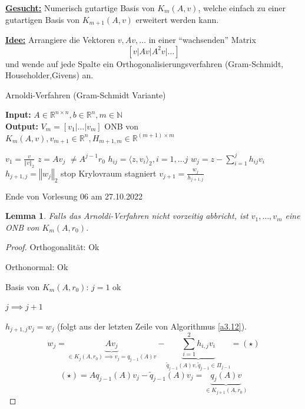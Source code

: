 \documentclass{book}
\newtheorem{lemma}[algorithm]{Lemma}
\def\R{\mathbb{R}}
\def\N{\mathbb{N}}
\begin{document}
            \underline{\textbf{Gesucht:}} Numerisch gutartige Basis von $K_m(A,v)$, welche einfach zu einer gutartigen Basis von $K_{m+1}(A,v)$ erweitert werden kann.

            \underline{\textbf{Idee:}} Arrangiere die Vektoren $v,Av,\dots$ in einer ``wachsenden'' Matrix
            \[[v\vert Av\vert A^2v\vert \dots]\]
            und wende auf jede Spalte ein Orthogonalisierungsverfahren (Gram-Schmidt, Householder,Givens) an.

            \begin{algorithm}[H]\label{a3.12}
                \caption{Arnoldi-Verfahren (Gram-Schmidt Variante)}
                \textbf{Input:} $A\in\R^{n\times n},b\in\R^n,m\in\N$\\
                \textbf{Output:} $V_m=[v_1\vert \dots\vert v_m]$ ONB von $K_m(A,v),v_{m+1}\in\R^n,H_{m+1,m}\in\R^{(m+1)\times m}$
                \begin{algorithmic}
                \State $v_1=\frac{v}{\left\Vert v \right\Vert_2}$
                    \State $z=Av_j$ \Comment $\neq A^{j-1}r_0$
                    \State $h_{ij}=\langle z,v_i \rangle_2,i=1,\dots j$
                    \State $w_j=z-\sum_{i=1}^j h_{ij}v_i$
                    \State $h_{j+1,j}=\left\Vert w_j \right\Vert_2$
                        \State stop \Comment Krylovraum stagniert
                    \EndIf
                \State $v_{j+1}=\frac{w_j}{h_{j+1,j}}$
                \EndFor
                \end{algorithmic}
            \end{algorithm}

            \noindent
            \xrfill[0.7ex]{1pt}Ende von Vorlesung 06 am 27.10.2022\xrfill[0.7ex]{1pt}

            \begin{lemma}\label{l3.13}
                Falls das Arnoldi-Verfahren nicht vorzeitig abbricht, ist $v_1,\dots,v_m$ eine 
                ONB von $K_m(A,r_0)$.
            \end{lemma}
            \begin{proof}
                Orthogonalität: Ok

                Orthonormal: Ok

                Basis von $K_m(A,r_0)$: $j=1$ ok

                $j\implies j+1$

                $h_{j+1,j}v_j = w_j$ (folgt aus der letzten Zeile von Algorithmus \ref{a3.12}).
                \[
                    w_j=\underbrace{Av_j}_{\in K_j(A,r_0)\implies v_j=q_{j-1}(A)v}-\underbrace{\sum_{i=1}^2h_{i,j}v_i}_{\tilde{q}_{j-1}(A)v, \tilde{q}_{j-1}\in \Pi_{j-1}}  = (\star)
                \]
                \[
                    (\star) = Aq_{j-1}(A)v_j - \tilde{q}_{j-1}(A)v_j=\underbrace{q_{j}(A)v}_{\in K_{j+1}(A,r_0)}    
                \]
            \end{proof}
\end{document}
